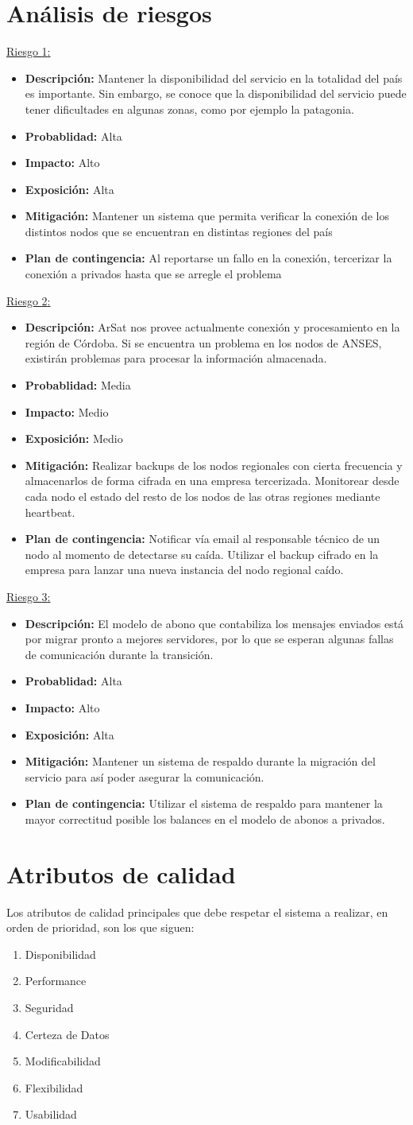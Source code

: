 \documentclass[a4paper, 10pt, twoside]{article}
\newcommand{\riesgo}[7]{
  \underline{Riesgo {#1}:}
  \begin{itemize}   
    \item \textbf{Descripción:} {#2}
    \item \textbf{Probablidad:} {#3}
    \item \textbf{Impacto:} {#4}
    \item \textbf{Exposición:} {#5}
    \item \textbf{Mitigación:} {#6}
    \item \textbf{Plan de contingencia:} {#7}
  \end{itemize}
}
\begin{document}
\section{Análisis de riesgos}

\riesgo{1}
    {Mantener la disponibilidad del servicio en la totalidad del país es importante. Sin embargo, se conoce que la disponibilidad del servicio puede tener dificultades en algunas zonas, como por ejemplo la patagonia.}
    {Alta}
    {Alto}
    {Alta}
    {Mantener un sistema que permita verificar la conexión de los distintos nodos que se encuentran en distintas regiones del país}
    {Al reportarse un fallo en la conexión, tercerizar la conexión a privados hasta que se arregle el problema}

\riesgo{2}
    {ArSat nos provee actualmente conexión y procesamiento en la región de Córdoba. Si se encuentra un problema en los nodos de ANSES, existirán problemas para procesar la información almacenada.}
    {Media}
    {Medio}
    {Medio}
    {Realizar backups de los nodos regionales con cierta frecuencia y almacenarlos de forma cifrada en una empresa tercerizada. Monitorear desde cada nodo el estado del resto de los nodos de las otras regiones mediante heartbeat.}
    {Notificar vía email al responsable técnico de un nodo al momento de detectarse su caída. Utilizar el backup cifrado en la empresa para lanzar una nueva instancia del nodo regional caído.}

\riesgo{3}
    {El modelo de abono que contabiliza los mensajes enviados está por migrar pronto a mejores servidores, por lo que se esperan algunas fallas de comunicación durante la transición.}
    {Alta}
    {Alto}
    {Alta}
    {Mantener un sistema de respaldo durante la migración del servicio para así poder asegurar la comunicación.}
    {Utilizar el sistema de respaldo para mantener la mayor correctitud posible los balances en el modelo de abonos a privados.}

\newpage

\section{Atributos de calidad}

Los atributos de calidad principales que debe respetar el sistema a realizar, en orden de prioridad, son los que siguen:

\begin{enumerate}
\item Disponibilidad
\item Performance
\item Seguridad
\item Certeza de Datos
\item Modificabilidad
\item Flexibilidad
\item Usabilidad
\end{enumerate}
\end{document}
